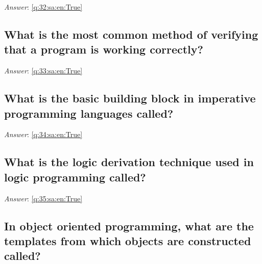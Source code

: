 \documentclass[a4paper,11pt,oneside]{article}
\begin{document}
\begin{sloppypar}
\vspace{1cm}

\textit{Answer}: \autoref{q:32:sa:en:True}



\subsection{What is the most common method of verifying that a program is working correctly?}

\label{q:33:sa:en:False}

\vspace{2cm}

\noindent\makebox[\textwidth]{\hrulefill}

\vspace{1cm}

\textit{Answer}: \autoref{q:33:sa:en:True}



\subsection{What is the basic building block in imperative programming languages called?}

\label{q:34:sa:en:False}

\vspace{2cm}

\noindent\makebox[\textwidth]{\hrulefill}

\vspace{1cm}

\textit{Answer}: \autoref{q:34:sa:en:True}



\subsection{What is the logic derivation technique used in logic programming called?}

\label{q:35:sa:en:False}

\vspace{2cm}

\noindent\makebox[\textwidth]{\hrulefill}

\vspace{1cm}

\textit{Answer}: \autoref{q:35:sa:en:True}



\subsection{In object oriented programming, what are the templates from which objects are constructed called?}


\end{sloppypar}
\end{document}
